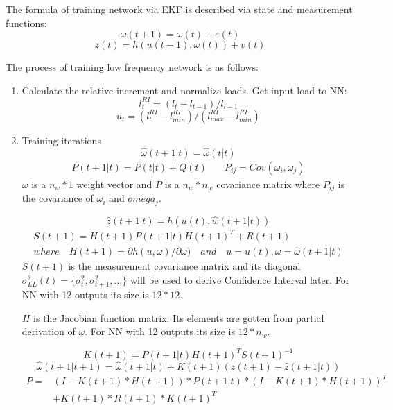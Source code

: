 \documentclass[letterpaper]{article}
\begin{document}
The formula of training network via EKF is described via state and measurement functions:
\begin{equation} \omega(t+1)=\omega(t)+\varepsilon(t) \end{equation}
\begin{equation} z(t) = h(u(t-1), \omega(t)) + v(t) \end{equation}

The process of training low frequency network is as follows:
\begin{enumerate}
\item Calculate the relative increment and normalize loads. Get input load to NN: \\
  \begin{equation}l_t^{RI} = (l_t-l_{t-1})/l_{l-1}\end{equation}
  \begin{equation}u_t = (l_t^{RI}-l_{min}^{RI})/(l_{max}^{RI}-l_{min}^{RI})\end{equation}
\item Training iterations
  \begin{equation} \hat{\omega}(t+1|t) = \hat{\omega}(t|t) \end{equation}
  \begin{align}
    P(t+1|t) = P(t|t) + Q(t) & \quad P_{ij} = Cov(\omega_i, \omega_j) 
  \end{align}
  $\omega$ is a $n_w*1$ weight vector and $P$ is a $n_w*n_w$ covariance matrix where $P_{ij}$ is the covariance of $\omega_i$ and $omega_j$.

  \begin{equation} \hat{z}(t+1|t)=h(u(t), \hat{w}(t+1|t)) \end{equation}
  \begin{align} 
    S(t+1) = H(t+1)P(t+1|t)H(t+1)^T + R(t+1) \nonumber\\
    where \quad H(t+1) = \partial h(u, \omega)/ \partial \omega) \quad and \quad u=u(t), \omega = \hat{\omega}(t+1|t)
  \end{align}
  $S(t+1)$ is the measurement covariance matrix and its diagonal $\sigma_{LL}^2(t)=\{\sigma_t^2,\sigma_{t+1}^2,...\}$ will be used to derive Confidence Interval later. For NN with 12 outputs its size is $12*12$.

  $H$ is the Jacobian function matrix. Its elements are gotten from partial derivation of $\omega$. For NN with 12 outputs its size is $12*n_w$.

  \begin{equation} K(t+1)=P(t+1|t)H(t+1)^TS(t+1)^{-1} \end{equation}
  \begin{equation} \hat{\omega}(t+1|t+1)=\hat{\omega}(t+1|t)+K(t+1)(z(t+1)-\hat{z}(t+1|t)) \end{equation}
  \begin{equation} 
    \begin{split}
      P = & (I - K(t+1)*H(t+1))*P(t+1|t)*(I-K(t+1)*H(t+1))^T \\
          & +K(t+1)*R(t+1)*K(t+1)^T
    \end{split}
  \end{equation}


\end{enumerate}
\end{document}
